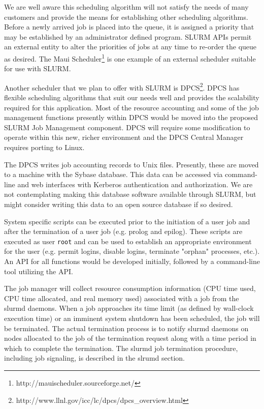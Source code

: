 We are well aware this scheduling algorithm will not satisfy the needs of many
customers and provide the means for establishing other scheduling
algorithms. Before a newly arrived job is placed into the queue, it
is assigned a priority that may be established by an administrator
defined program. SLURM APIs permit an external entity to alter the
priorities of jobs at any time to re-order the queue as desired.
The Maui Scheduler\footnote{http://mauischeduler.sourceforge.net/}
is one example of an external scheduler suitable for use with SLURM.

Another scheduler that we plan to offer with SLURM is
DPCS\footnote{http://www.llnl.gov/icc/lc/dpcs/dpcs\_overview.html}.  DPCS
has flexible scheduling algorithms that suit our needs well and provides
the scalability required for this application. Most of the resource
accounting and some of the job management functions presently within
DPCS would be moved into the proposed SLURM Job Management component.
DPCS will require some modification to operate within this new, richer
environment and the DPCS Central Manager requires porting to Linux.

The DPCS writes job accounting records to Unix files. Presently, these are
moved to a machine with the Sybase database. This data can be accessed
via command-line and web interfaces with Kerberos authentication and
authorization.  We are not contemplating making this database software
available through SLURM, but might consider writing this data to an open
source database if so desired.

System specific scripts can be executed prior to the initiation of a user
job and after the termination of a user job (e.g. prolog and epilog).
These scripts are executed as user {\tt root} and can be used to establish
an appropriate environment for the user (e.g. permit logins, disable
logins, terminate "orphan" processes, etc.).  An API for all functions
would be developed initially, followed by a command-line tool utilizing
the API.

The job manager will collect resource consumption information (CPU
time used, CPU time allocated, and real memory used) associated with
a job from the slurmd daemons.  When a job approaches its time limit
(as defined by wall-clock execution time) or an imminent system shutdown
has been scheduled, the job will be terminated.  The actual termination
process is to notify slurmd daemons on nodes allocated to the job of
the termination request along with a time period in which to complete
the termination.  The slurmd job termination procedure, including job
signaling, is described in the slrumd section.

